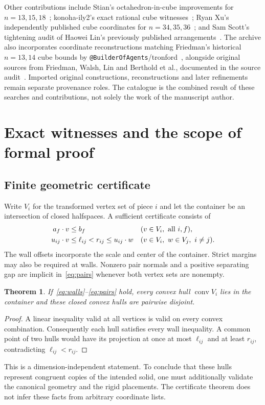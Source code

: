 \documentclass[11pt,a4paper]{article}
\newcommand{\conv}{\operatorname{conv}}
\newcommand{\code}[1]{\texttt{\nolinkurl{#1}}}
\newtheorem{theorem}{Theorem}
\begin{document}
Other contributions include Stian's octahedron-in-cube improvements for $n=13,15,18$~\cite{stian}; konoha-ily2's exact rational cube witnesses~\cite{konoha}; Ryan Xu's independently published cube coordinates for $n=34,35,36$~\cite{ryan}; and Sam Scott's tightening audit of Haowei Lin's previously published arrangements~\cite{scott}. The archive also incorporates coordinate reconstructions matching Friedman's historical $n=13,14$ cube bounds by \code{@BuilderOfAgents}/tronford~\cite{builderRecon}, alongside original sources from Friedman, Walsh, Lin and Berthold et al., documented in the source audit~\cite{repoAudit}. Imported original constructions, reconstructions and later refinements remain separate provenance roles. The catalogue is the combined result of these searches and contributions, not solely the work of the manuscript author.

\section{Exact witnesses and the scope of formal proof}
\subsection{Finite geometric certificate}
Write $V_i$ for the transformed vertex set of piece $i$ and let the container be an intersection of closed halfspaces. A sufficient certificate consists of
\begin{align}
a_f\cdot v&\leq b_f &&(v\in V_i,\ \hbox{all }i,f),\label{eq:walls}\\
u_{ij}\cdot v&\leq\ell_{ij}<r_{ij}\leq u_{ij}\cdot w
&& (v\in V_i,\ w\in V_j,\ i\ne j).\label{eq:pairs}
\end{align}
The wall offsets incorporate the scale and center of the container. Strict margins may also be required at walls. Nonzero pair normals and a positive separating gap are implicit in~\eqref{eq:pairs} whenever both vertex sets are nonempty.

\begin{theorem}\label{thm:certificate}
If~\eqref{eq:walls}--\eqref{eq:pairs} hold, every convex hull $\conv V_i$ lies in the container and these closed convex hulls are pairwise disjoint.
\end{theorem}
\begin{proof}
A linear inequality valid at all vertices is valid on every convex combination. Consequently each hull satisfies every wall inequality. A common point of two hulls would have its projection at once at most $\ell_{ij}$ and at least $r_{ij}$, contradicting $\ell_{ij}<r_{ij}$.
\end{proof}
This is a dimension-independent statement. To conclude that these hulls represent congruent copies of the intended solid, one must additionally validate the canonical geometry and the rigid placements. The certificate theorem does not infer these facts from arbitrary coordinate lists.
\end{document}
